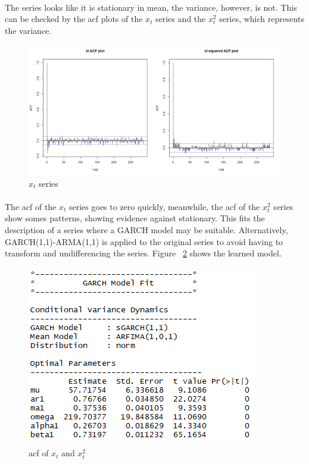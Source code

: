 \documentclass[12pt]{article}
\begin{document}
\paragraph{}
The series looks like it is stationary in mean, the variance, however, is not. This can be checked by the acf plots of the $x_t$ series and the $x_t^2$ series, which represents the variance.
\begin{figure}[H]
  \centering
  \includegraphics[width=\linewidth]{figure25.png}
  \caption{$x_t$ series}
  \label{fig:figure26}
\end{figure}

\paragraph{}
The acf of the $x_t$ series goes to zero quickly, meanwhile, the acf of the $x_t^2$ series show somes patterns, showing evidence against stationary. This fits the description of a series where a GARCH model may be suitable. Alternatively, GARCH(1,1)-ARMA(1,1) is applied to the original series to avoid having to transform and undifferencing the series. Figure ~\ref{fig:figure27} shows the learned model. 
\begin{figure}[H]
  \centering
  \includegraphics[width=0.5\linewidth]{figure26.png}
  \caption{acf of $x_t$ and $x_t^2$}
  \label{fig:figure27}
\end{figure}
\end{document}
